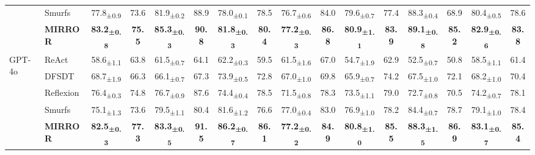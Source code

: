 \documentclass{article}
\begin{document}
\begin{table}[t]
\begin{adjustbox}{width=0.98\textwidth}
\begin{tabular}{@{}ll|cc|cc|cc|cc|cc|cc|cc@{}}
& Smurfs & 77.8\textsubscript{±0.9} & 73.6 & 81.9\textsubscript{±0.2} & 88.9 & 78.0\textsubscript{±0.1} & 78.5 & 76.7\textsubscript{±0.6} & 84.0 & 79.6\textsubscript{±0.7} & 77.4 & 88.3\textsubscript{±0.4} & 68.9 & 80.4\textsubscript{±0.5} & 78.6 \\
&\cellcolor{green!18}\textbf{MIRROR} & \cellcolor{green!18}\textbf{83.2\textsubscript{±0.8}} & \cellcolor{green!18}\textbf{75.5} & \cellcolor{green!18}\textbf{85.3\textsubscript{±0.3}} & \cellcolor{green!18}\textbf{90.8} & \cellcolor{green!18}\textbf{81.8\textsubscript{±0.3}} & \cellcolor{green!18}\textbf{80.4} & \cellcolor{green!18}\textbf{77.2\textsubscript{±0.3}} & \cellcolor{green!18}\textbf{86.8} & \cellcolor{green!18}\textbf{80.9\textsubscript{±1.1}} & \cellcolor{green!18}\textbf{83.9} & \cellcolor{green!18}\textbf{89.1\textsubscript{±0.8}} & \cellcolor{green!18}\textbf{85.2} & \cellcolor{green!18}\textbf{82.9\textsubscript{±0.6}} & \cellcolor{green!18}\textbf{83.8} \\
\midrule
\multirow{5}{*}{GPT-4o} & ReAct & 58.6\textsubscript{±1.1} & 63.8 & 61.5\textsubscript{±0.7} & 64.1 & 62.2\textsubscript{±0.3} & 59.5 & 61.5\textsubscript{±1.6} & 67.0 & 54.7\textsubscript{±1.9} & 62.9 & 52.5\textsubscript{±0.7} & 50.8 & 58.5\textsubscript{±1.1} & 61.4 \\
 & DFSDT & 68.7\textsubscript{±1.9} & 66.3 & 66.1\textsubscript{±0.7} & 67.3 & 73.9\textsubscript{±0.5} & 72.8 & 67.0\textsubscript{±1.0} & 69.8 & 65.9\textsubscript{±0.7} & 74.2 & 67.5\textsubscript{±1.0} & 72.1 & 68.2\textsubscript{±1.0} & 70.4 \\
  & Reflexion & 76.4\textsubscript{±0.3} & 74.8 & 76.7\textsubscript{±0.9} & 87.6 & 74.4\textsubscript{±0.4} & 78.5 & 71.5\textsubscript{±0.8} & 78.3 & 73.5\textsubscript{±1.1} & 79.0 & 72.7\textsubscript{±0.8} & 70.5 & 74.2\textsubscript{±0.7} & 78.1 \\
 & Smurfs & 75.1\textsubscript{±1.3} & 73.6 & 79.5\textsubscript{±1.1} & 80.4 & 81.6\textsubscript{±1.2} & 76.6 & 77.0\textsubscript{±0.4} & 83.0 & 76.9\textsubscript{±1.0} & 78.2 & 84.4\textsubscript{±0.7} & 78.7 & 79.1\textsubscript{±1.0} & 78.4 \\
 & \cellcolor{green!18}\textbf{MIRROR} & \cellcolor{green!18}\textbf{82.5\textsubscript{±0.3}} & \cellcolor{green!18}\textbf{77.3} & \cellcolor{green!18}\textbf{83.3\textsubscript{±0.5}} & \cellcolor{green!18}\textbf{91.5} & \cellcolor{green!18}\textbf{86.2\textsubscript{±0.7}} & \cellcolor{green!18}\textbf{86.1} & \cellcolor{green!18}\textbf{77.2\textsubscript{±0.2}} & \cellcolor{green!18}\textbf{84.9} & \cellcolor{green!18}\textbf{80.8\textsubscript{±1.0}} & \cellcolor{green!18}\textbf{85.5} & \cellcolor{green!18}\textbf{88.3\textsubscript{±1.5}} & \cellcolor{green!18}\textbf{86.9} & \cellcolor{green!18}\textbf{83.1\textsubscript{±0.7}} & \cellcolor{green!18}\textbf{85.4} \\

\end{tabular}
\end{adjustbox}
\end{table}
\end{document}

